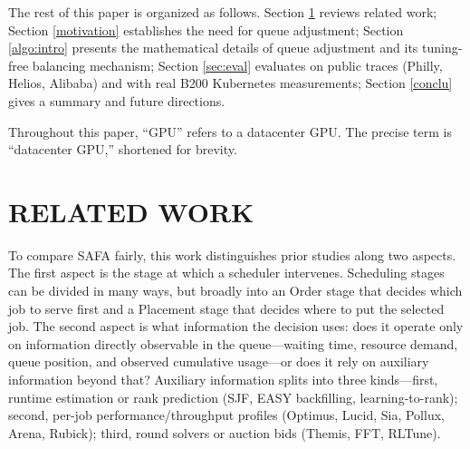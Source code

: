 \documentclass{ieeetj}
\begin{document}
The rest of this paper is organized as follows. Section \ref{Related} reviews related work; Section \ref{motivation} establishes the need for queue adjustment; Section \ref{algo:intro} presents the mathematical details of queue adjustment and its tuning-free balancing mechanism; Section \ref{sec:eval} evaluates on public traces (Philly, Helios, Alibaba) and with real B200 Kubernetes measurements; Section \ref{conclu} gives a summary and future directions.

Throughout this paper, ``GPU'' refers to a datacenter GPU. The precise term is ``datacenter GPU,'' shortened for brevity.

\section{RELATED WORK}\label{Related}
To compare SAFA fairly, this work distinguishes prior studies along two aspects. The first aspect is the stage at which a scheduler intervenes. Scheduling stages can be divided in many ways, but broadly into an Order stage that decides which job to serve first and a Placement stage that decides where to put the selected job. The second aspect is what information the decision uses: does it operate only on information directly observable in the queue---waiting time, resource demand, queue position, and observed cumulative usage---or does it rely on auxiliary information beyond that? Auxiliary information splits into three kinds---first, runtime estimation or rank prediction (SJF, EASY backfilling, learning-to-rank); second, per-job performance/throughput profiles (Optimus, Lucid, Sia, Pollux, Arena, Rubick); third, round solvers or auction bids (Themis, FFT, RLTune).
\end{document}
